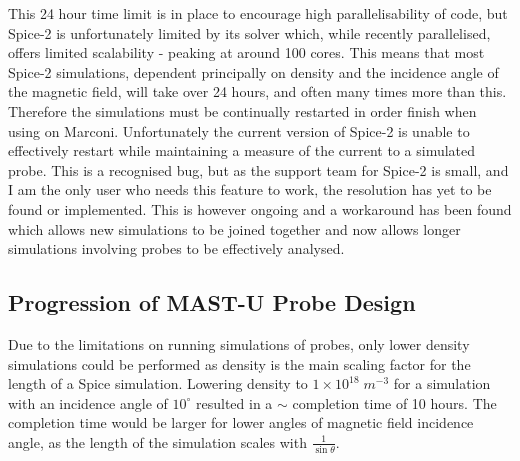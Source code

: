 \documentclass[a4paper, 12pt]{article} %
\begin{document}
    This 24 hour time limit is in place to encourage high parallelisability of code, but Spice-2 is unfortunately limited by its solver which, while recently parallelised, offers limited scalability - peaking at around 100 cores.
    This means that most Spice-2 simulations, dependent principally on density and the incidence angle of the magnetic field, will take over 24 hours, and often many times more than this. 
    Therefore the simulations must be continually restarted in order finish when using on Marconi. 
    Unfortunately the current version of Spice-2 is unable to effectively restart while maintaining a measure of the current to a simulated probe. 
    This is a recognised bug, but as the support team for Spice-2 is small, and I am the only user who needs this feature to work, the resolution has yet to be found or implemented.
    This is however ongoing and a workaround has been found which allows new simulations to be joined together and now allows longer simulations involving probes to be effectively analysed. 
    
	
\subsection{\label{subsec:mastu_probe_design} Progression of MAST-U Probe Design}
	Due to the limitations on running simulations of probes, only lower density simulations could be performed as density is the main scaling factor for the length of a Spice simulation.
	Lowering density to $1 \times 10^{18} \; m^{-3}$ for a simulation with an incidence angle of $10^{\circ}$ resulted in a $\sim$ completion time of 10 hours.
	The completion time would be larger for lower angles of magnetic field incidence angle, as the length of the simulation scales with $\frac{1}{\sin{\theta}}$. 
	
\end{document}
